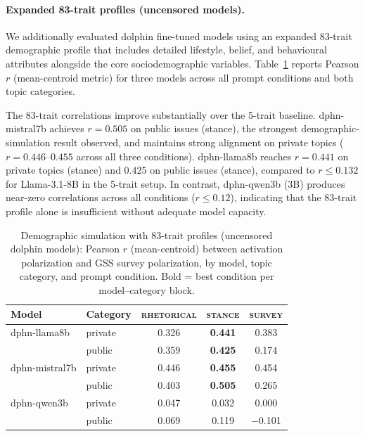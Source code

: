 \paragraph{Expanded 83-trait profiles (uncensored models).}
We additionally evaluated dolphin fine-tuned models using an expanded 83-trait demographic profile that includes detailed lifestyle, belief, and behavioural attributes alongside the core sociodemographic variables. Table~\ref{tab:demographic_dolphin} reports Pearson $r$ (mean-centroid metric) for three models across all prompt conditions and both topic categories.

The 83-trait correlations improve substantially over the 5-trait baseline. dphn-mistral7b achieves $r = 0.505$ on public issues (stance), the strongest demographic-simulation result observed, and maintains strong alignment on private topics ($r = 0.446$--$0.455$ across all three conditions). dphn-llama8b reaches $r = 0.441$ on private topics (stance) and $0.425$ on public issues (stance), compared to $r \leq 0.132$ for Llama-3.1-8B in the 5-trait setup. In contrast, dphn-qwen3b (3B) produces near-zero correlations across all conditions ($r \leq 0.12$), indicating that the 83-trait profile alone is insufficient without adequate model capacity.

\begin{table}[ht]
\centering
\small
\caption{Demographic simulation with 83-trait profiles (uncensored dolphin models): Pearson $r$ (mean-centroid) between activation polarization and GSS survey polarization, by model, topic category, and prompt condition. Bold = best condition per model--category block.}
\label{tab:demographic_dolphin}
\begin{tabular}{llccc}
\toprule
Model & Category & \textsc{rhetorical} & \textsc{stance} & \textsc{survey} \\
\midrule
dphn-llama8b   & private & 0.326 & \textbf{0.441} & 0.383 \\
               & public  & 0.359 & \textbf{0.425} & 0.174 \\
\midrule
dphn-mistral7b & private & 0.446 & \textbf{0.455} & 0.454 \\
               & public  & 0.403 & \textbf{0.505} & 0.265 \\
\midrule
dphn-qwen3b    & private & 0.047 & 0.032 & 0.000 \\
               & public  & 0.069 & 0.119 & $-$0.101 \\
\bottomrule
\end{tabular}
\end{table}
